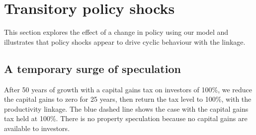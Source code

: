 \newpage
\section{Transitory policy shocks}

This section explores the effect of a change in policy using our model and illustrates that policy shocks appear to drive cyclic behaviour with the linkage.

\subsection{A temporary surge of speculation}
After 50 years of growth with a capital gains tax on investors of 100\%, we reduce the capital gains to zero for 25 years, then return the tax level to 100\%, with the productivity linkage. The blue dashed line shows the case with the capital gains tax held at 100\%. There is no property speculation because no capital gains are available to investors.

